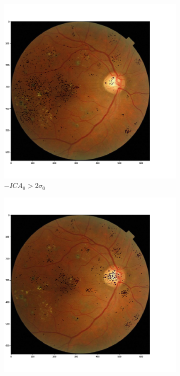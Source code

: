 \documentclass{llncs}
\begin{document}
\begin{figure}[h!]
	\centering
	\begin{subfigure}[b]{0.32\textwidth}
		\centering
		\includegraphics[width=\textwidth]{./figures/c3/retina_mICA0.png}
		\caption{$-ICA_0 > 2 \sigma_0$}	
	\end{subfigure}
	\hfill    
	\begin{subfigure}[b]{0.32\textwidth}
		\centering
		\includegraphics[width=\textwidth]{./figures/c3/retina_mICA1.png}

\end{subfigure}
\end{figure}
\end{document}

